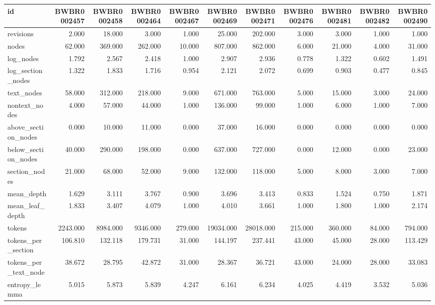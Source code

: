 \begin{tabular}{lrrrrrrrrrr}
\toprule
id & BWBR0002457 & BWBR0002458 & BWBR0002464 & BWBR0002467 & BWBR0002469 & BWBR0002471 & BWBR0002476 & BWBR0002481 & BWBR0002482 & BWBR0002490 \\
\midrule
revisions & 2.000 & 18.000 & 3.000 & 1.000 & 25.000 & 202.000 & 3.000 & 3.000 & 1.000 & 1.000 \\
\cline{1-11}
nodes & 62.000 & 369.000 & 262.000 & 10.000 & 807.000 & 862.000 & 6.000 & 21.000 & 4.000 & 31.000 \\
\cline{1-11}
log\_nodes & 1.792 & 2.567 & 2.418 & 1.000 & 2.907 & 2.936 & 0.778 & 1.322 & 0.602 & 1.491 \\
\cline{1-11}
log\_section\_nodes & 1.322 & 1.833 & 1.716 & 0.954 & 2.121 & 2.072 & 0.699 & 0.903 & 0.477 & 0.845 \\
\cline{1-11}
text\_nodes & 58.000 & 312.000 & 218.000 & 9.000 & 671.000 & 763.000 & 5.000 & 15.000 & 3.000 & 24.000 \\
\cline{1-11}
nontext\_nodes & 4.000 & 57.000 & 44.000 & 1.000 & 136.000 & 99.000 & 1.000 & 6.000 & 1.000 & 7.000 \\
\cline{1-11}
above\_section\_nodes & 0.000 & 10.000 & 11.000 & 0.000 & 37.000 & 16.000 & 0.000 & 0.000 & 0.000 & 0.000 \\
\cline{1-11}
below\_section\_nodes & 40.000 & 290.000 & 198.000 & 0.000 & 637.000 & 727.000 & 0.000 & 12.000 & 0.000 & 23.000 \\
\cline{1-11}
section\_nodes & 21.000 & 68.000 & 52.000 & 9.000 & 132.000 & 118.000 & 5.000 & 8.000 & 3.000 & 7.000 \\
\cline{1-11}
mean\_depth & 1.629 & 3.111 & 3.767 & 0.900 & 3.696 & 3.413 & 0.833 & 1.524 & 0.750 & 1.871 \\
\cline{1-11}
mean\_leaf\_depth & 1.833 & 3.407 & 4.079 & 1.000 & 4.010 & 3.661 & 1.000 & 1.800 & 1.000 & 2.174 \\
\cline{1-11}
tokens & 2243.000 & 8984.000 & 9346.000 & 279.000 & 19034.000 & 28018.000 & 215.000 & 360.000 & 84.000 & 794.000 \\
\cline{1-11}
tokens\_per\_section & 106.810 & 132.118 & 179.731 & 31.000 & 144.197 & 237.441 & 43.000 & 45.000 & 28.000 & 113.429 \\
\cline{1-11}
tokens\_per\_text\_node & 38.672 & 28.795 & 42.872 & 31.000 & 28.367 & 36.721 & 43.000 & 24.000 & 28.000 & 33.083 \\
\cline{1-11}
entropy\_lemma & 5.015 & 5.873 & 5.839 & 4.247 & 6.161 & 6.234 & 4.025 & 4.419 & 3.532 & 5.036 \\

\end{tabular}
